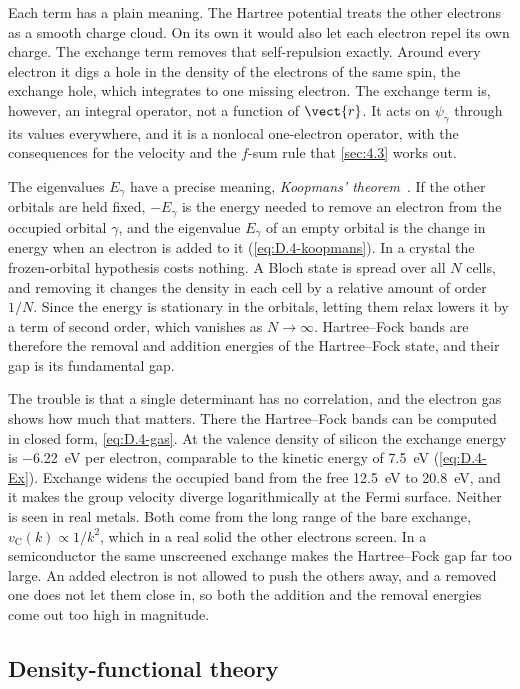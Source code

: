 Each term has a plain meaning. The Hartree potential treats the other electrons as a smooth charge cloud. On its own it would also let each electron repel its own charge. The exchange term removes that self-repulsion exactly. Around every electron it digs a hole in the density of the electrons of the same spin, the exchange hole, which integrates to one missing electron. The exchange term is, however, an integral operator, not a function of $\vect{r}$. It acts on $\psi_\gamma$ through its values everywhere, and it is a nonlocal one-electron operator, with the consequences for the velocity and the $f$-sum rule that \cref{sec:4.3} works out.

The eigenvalues $E_\gamma$ have a precise meaning, \emph{Koopmans' theorem}~\cite{koopmans1934zuordnung}. If the other orbitals are held fixed, $-E_\gamma$ is the energy needed to remove an electron from the occupied orbital $\gamma$, and the eigenvalue $E_\gamma$ of an empty orbital is the change in energy when an electron is added to it (\cref{eq:D.4-koopmans}). In a crystal the frozen-orbital hypothesis costs nothing. A Bloch state is spread over all $N$ cells, and removing it changes the density in each cell by a relative amount of order $1/N$. Since the energy is stationary in the orbitals, letting them relax lowers it by a term of second order, which vanishes as $N \to \infty$. Hartree--Fock bands are therefore the removal and addition energies of the Hartree--Fock state, and their gap is its fundamental gap.

The trouble is that a single determinant has no correlation, and the electron gas shows how much that matters. There the Hartree--Fock bands can be computed in closed form, \cref{eq:D.4-gas}. At the valence density of silicon the exchange energy is \SI{-6.22}{eV} per electron, comparable to the kinetic energy of \SI{7.5}{eV} (\cref{eq:D.4-Ex}). Exchange widens the occupied band from the free \SI{12.5}{eV} to \SI{20.8}{eV}, and it makes the group velocity diverge logarithmically at the Fermi surface. Neither is seen in real metals. Both come from the long range of the bare exchange, $v_{\mathrm{C}}(k) \propto 1/k^2$, which in a real solid the other electrons screen. In a semiconductor the same unscreened exchange makes the Hartree--Fock gap far too large. An added electron is not allowed to push the others away, and a removed one does not let them close in, so both the addition and the removal energies come out too high in magnitude.

\subsection{Density-functional theory}

